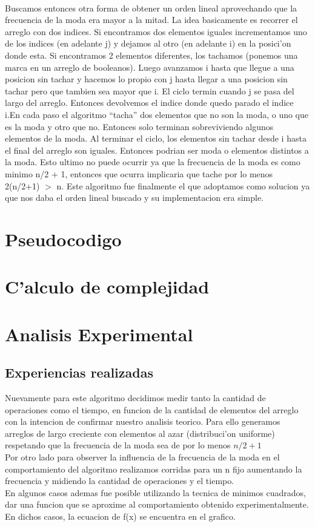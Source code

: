 \paragraph{}
Buscamos entonces otra forma de  obtener un orden lineal aprovechando que la frecuencia de la moda era mayor a la mitad. La idea basicamente es recorrer el  arreglo con dos indices. Si encontramos dos elementos iguales incrementamos uno de los indices (en adelante j) y dejamos al otro (en adelante i) en la posici'on donde esta. Si encontramos 2 elementos diferentes, los tachamos (ponemos una marca en un arreglo de booleanos). Luego avanzamos  i hasta que llegue a una posicion sin tachar y hacemos lo propio con j hasta llegar a una posicion sin tachar pero que tambien sea mayor que i. El ciclo termin cuando j se pasa del largo del arreglo. Entonces devolvemos el indice donde quedo parado el indice i.En cada paso el algoritmo ``tacha'' dos elementos que no son la moda, o uno que es la moda y otro que no. Entonces solo terminan sobreviviendo algunos elementos de la moda. Al terminar el ciclo, los elementos sin tachar desde i hasta el final del arreglo son iguales. Entonces podrian ser moda o elementos distintos a la moda. Esto ultimo no puede ocurrir ya que la frecuencia de la moda es como minimo n/2 + 1, entonces que ocurra  implicaria que tache por lo menos 2(n/2+1) $>$ n. Este algoritmo fue finalmente el que adoptamos como solucion ya que nos daba el orden lineal buscado y su implementacion era simple.

\section{Pseudocodigo}


\section{C'alculo de complejidad}

\section{Analisis Experimental}
\subsection{Experiencias realizadas}
Nuevamente para este algoritmo decidimos medir tanto la cantidad de operaciones como el tiempo, en funcion de la cantidad de 
elementos del arreglo con la intencion de confirmar nuestro analisis teorico. Para ello generamos arreglos de largo creciente 
con elementos al azar (distribuci'on uniforme) respetando que la frecuencia de la moda sea de por lo menos $n/2 + 1$\\
Por otro lado para observer la influencia de la frecuencia de la moda en el comportamiento del algoritmo realizamos corridas 
para un n fijo aumentando la frecuencia y midiendo la cantidad de operaciones y el tiempo.\\
En algunos casos ademas fue posible utilizando la tecnica de minimos cuadrados, dar una funcion que se aproxime al comportamiento obtenido experimentalmente. En dichos casos, la ecuacion de f(x) se encuentra en el grafico.

